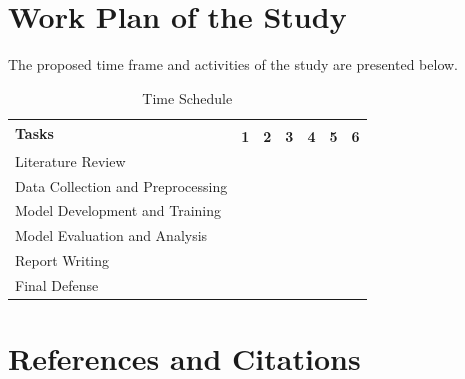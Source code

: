 \documentclass[12pt, a4paper]{article}
\numberwithin{equation}{section}
\begin{document}
\newpage

\section*{Work Plan of the Study}

The proposed time frame and activities of the study are presented below.

\begin{table}[H]
\centering
{\singlespacing
\caption{Time Schedule}
\renewcommand{\arraystretch}{1.4}
\setlength{\tabcolsep}{4pt}
\begin{tabular}{|p{5.5cm}|*{6}{>{\centering\arraybackslash}p{1.1cm}|}}
\hline
\multirow{2}{*}{\textbf{Tasks}}
  & \multicolumn{6}{c|}{\textbf{Weeks}} \\
\cline{2-7}
  & \textbf{1} & \textbf{2} & \textbf{3} & \textbf{4} & \textbf{5} & \textbf{6} \\
\hline
Literature Review & \cellcolor{ganttblue} & \cellcolor{ganttblue} & & & & \\
\hline
Data Collection and Preprocessing & & \cellcolor{ganttblue} & \cellcolor{ganttblue} & & & \\
\hline
Model Development and Training & & & \cellcolor{ganttblue} & \cellcolor{ganttblue} & & \\
\hline
Model Evaluation and Analysis & & & & \cellcolor{ganttblue} & \cellcolor{ganttblue} & \\
\hline
Report Writing & & & & & \cellcolor{ganttblue} & \cellcolor{ganttblue} \\
\hline
Final Defense & & & & & & \cellcolor{ganttblue} \\
\hline
\end{tabular}
\label{tab:schedule}
}
\end{table}

\newpage

\section*{References and Citations}
{\singlespacing
\setlength{\bibitemsep}{12pt}
\nocite{*}
\printbibliography
}
\end{document}
